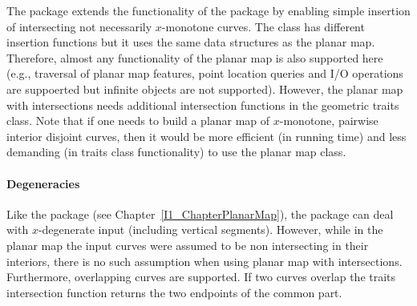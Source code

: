   The  package extends the
  functionality of the  package by enabling simple
  insertion of intersecting not necessarily $x$-monotone curves. The
   class has different insertion
  functions but it uses the same data structures as the planar
  map. Therefore, almost any functionality of the planar map is also
  supported here (e.g., traversal of planar map features, point
  location queries and I/O operations are suppoerted but infinite
  objects are not supported). However, the planar map with
  intersections needs additional intersection functions in the
  geometric traits class. Note that if one needs to build a planar map
  of $x$-monotone, pairwise interior disjoint curves, then it would be
  more efficient (in running time) and less demanding (in traits class
  functionality) to use the planar map class.

\paragraph{Degeneracies} 
  Like the  package (see
  Chapter~\ref{I1_ChapterPlanarMap}), the  package can deal with $x$-degenerate input (including
  vertical segments). However, while in the planar map the input
  curves were assumed to be non intersecting in their interiors, there
  is no such assumption when using planar map with
  intersections. Furthermore, overlapping curves are supported. If two
  curves overlap the traits intersection function returns the two
  endpoints of the common part.



